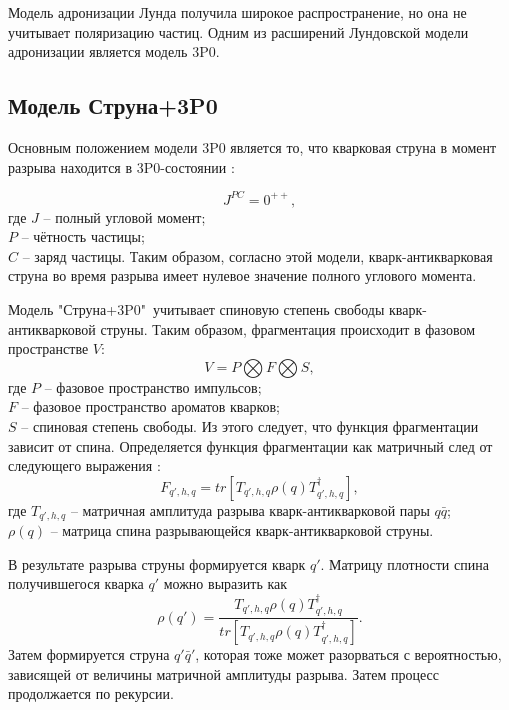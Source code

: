 \documentclass{extreport}
\begin{document}
Модель адронизации Лунда получила широкое распространение, но она не учитывает поляризацию частиц. Одним из расширений Лундовской модели адронизации является модель 3P0.

\subsection{Модель Струна+3P0}

Основным положением модели 3P0 является то, что кварковая струна в момент разрыва находится в 3P0-состоянии \cite{Feng_2022}:

\begin{equation}
	J^{PC} = 0^{++},
\end{equation}
где $J$ -- полный угловой момент; \\
$P$ -- чётность частицы; \\
$C$ -- заряд частицы.
Таким образом, согласно этой модели, кварк-антикварковая струна во время разрыва имеет нулевое значение полного углового момента.

Модель "Струна+3P0"\ учитывает спиновую степень свободы кварк-антикварковой струны. Таким образом, фрагментация происходит в фазовом пространстве $V$:
\begin{equation}
	V = P \bigotimes F \bigotimes S,
\end{equation}
где $P$ -- фазовое пространство импульсов; \\
$F$ -- фазовое пространство ароматов кварков; \\
$S$ -- спиновая степень свободы. Из этого следует, что функция фрагментации зависит от спина. Определяется функция фрагментации как матричный след от следующего выражения \cite{Artru_2022}:
\begin{equation}
	F_{q', h, q} = tr [T_{q', h, q} \rho(q) T^\dagger_{q', h, q}],
\end{equation}
где $T_{q', h, q}$ -- матричная амплитуда разрыва кварк-антикварковой пары $q\bar{q}$; \\
$\rho(q)$ -- матрица спина разрывающейся кварк-антикварковой струны.

В результате разрыва струны формируется кварк $q'$. Матрицу плотности спина получившегося кварка $q'$ можно выразить как
\begin{equation}
	\label{density}
	\rho(q') = \frac{T_{q', h, q}\rho(q)T^\dagger_{q', h, q}}{tr [T_{q', h, q}\rho(q)T^\dagger_{q', h, q}]}.
\end{equation}
Затем формируется струна $q'\bar{q}'$, которая тоже может разорваться с вероятностью, зависящей от величины матричной амплитуды разрыва. Затем процесс продолжается по рекурсии.
\end{document}
